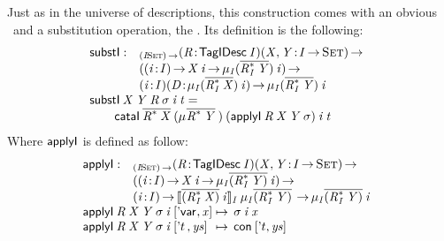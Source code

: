 Just as in the universe of descriptions, this construction comes with
an obvious \return\ and a substitution operation, the \bind. Its
definition is the following:
%
\[\stk{
\begin{array}{@{}ll}
\substI : & _{\PI{\V{I}}{\Set}}
            \PITEL{\V{R}}{\TagIDesc{\V{I}}}
            \PI{\V{X}, \V{Y}}{\V{I} \To \Set} \\
          & (\PI{\V{i}}{\V{I}} \V{X}\:\V{i} \To 
                               \IMu{\V{I}}{(\toIDesc{\FreeIMonad{\V{R}}{\V{I}}{\V{Y}}})}{\V{i}}) \To \\
          & \PITEL{\V{i}}{\V{I}}
            \PITEL{\V{D}}{\IMu{\V{I}}{(\toIDesc{\FreeIMonad{\V{R}}{\V{I}}{\V{X}}})}{\V{i}}} \To
            \IMu{\V{I}}{(\toIDesc{\FreeIMonad{\V{R}}{\V{I}}{\V{Y}}})}{\V{i}}
\end{array} \\
\substI\: \V{X}\: \V{Y}\: \V{R}\: \V{\sigma}\: \V{i}\: \V{t} = \\
\qquad    \cataI\: \toIDesc{\FreeIMonad{\V{R}}{}{\V{X}}}\:
                      (\IMu{}{\toIDesc{\FreeIMonad{\V{R}}{}{\V{Y}}}})\:
                      (\F{applyI}\: \V{R}\: \V{X}\: \V{Y}\: \V{\sigma})\:
                      \V{i}\:
                      \V{t} 
}\]
% 
Where  $\F{applyI}$ is defined as follow:
%
\[\stk{
\begin{array}{@{}ll}
\F{applyI} : & _{\PI{\V{I}}{\Set}}
            \PITEL{\V{R}}{\TagIDesc{\V{I}}}
            \PI{\V{X}, \V{Y}}{\V{I} \To \Set} \\
          & (\PI{\V{i}}{\V{I}} \V{X}\: \V{i} \To \IMu{\V{I}}{\toIDesc{(\FreeIMonad{\V{R}}{\V{I}}{\V{Y}})}}{\V{i}}) \To \\
          & \PI{\V{i}}{\V{I}} 
            \idescop{\toIDesc{(\FreeIMonad{\V{R}}
                                         {\V{I}}
                                         {\V{X}})}\: 
                     \V{i}}
                    {\V{I}}
                    {\IMu{\V{I}}{\toIDesc{(\FreeIMonad{\V{R}}{\V{I}}{\V{Y}})}}} \To 
           \IMu{\V{I}}{\toIDesc{(\FreeIMonad{\V{R}}{\V{I}}{\V{Y}})}}{\V{i}}
\end{array} \\
\begin{array}{@{}l@{\:\mapsto\:\:}l}
\F{applyI}\: \V{R}\: \V{X}\: \V{Y}\: \V{\sigma}\: \V{i}\: \pair{\DVar{\!}}{\V{x}}{}   & \V{\sigma}\: \V{i}\: \V{x}                   \\
\F{applyI}\: \V{R}\: \V{X}\: \V{Y}\: \V{\sigma}\: \V{i}\: \pair{\etag{t}\,}{\V{ys}}{} & \Con{\pair{\etag{t}}{\V{ys}}{}}
\end{array}
}\]
 

